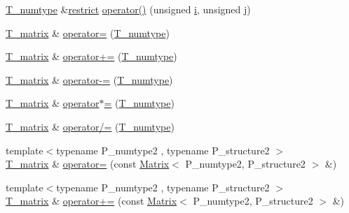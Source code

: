 \begin{DoxyCompactItemize}
\item 
\hyperlink{classMatrix_aa2e0c7f09cbf31c078ad0b0977588e70}{T\+\_\+numtype} \&\hyperlink{compiler_8h_a080abdcb9c02438f1cd2bb707af25af8}{restrict} \hyperlink{classMatrix_aed58f052dd1ef9c14a3fcc3335a90905}{operator()} (unsigned \hyperlink{indexexpr_8h_aabd77643995707c185e95c8cb2782c81}{i}, unsigned \hyperlink{indexexpr_8h_aa1f3325d66516548e69238097857fa98}{j})
\item 
\hyperlink{classMatrix_ae07f7dfb83325c5854333ed7e85d2ebb}{T\+\_\+matrix} \& \hyperlink{classMatrix_a7685367f9f39a4a5491f1ebdd8bc9c1f}{operator=} (\hyperlink{classMatrix_aa2e0c7f09cbf31c078ad0b0977588e70}{T\+\_\+numtype})
\item 
\hyperlink{classMatrix_ae07f7dfb83325c5854333ed7e85d2ebb}{T\+\_\+matrix} \& \hyperlink{classMatrix_a7c018a47b2dc374ce5557011ce25a97c}{operator+=} (\hyperlink{classMatrix_aa2e0c7f09cbf31c078ad0b0977588e70}{T\+\_\+numtype})
\item 
\hyperlink{classMatrix_ae07f7dfb83325c5854333ed7e85d2ebb}{T\+\_\+matrix} \& \hyperlink{classMatrix_a4c6e1284becba17f5e718be131297b05}{operator-\/=} (\hyperlink{classMatrix_aa2e0c7f09cbf31c078ad0b0977588e70}{T\+\_\+numtype})
\item 
\hyperlink{classMatrix_ae07f7dfb83325c5854333ed7e85d2ebb}{T\+\_\+matrix} \& \hyperlink{classMatrix_a5efa9625f2bc76625fb8dbd4d7c0ee79}{operator$\ast$=} (\hyperlink{classMatrix_aa2e0c7f09cbf31c078ad0b0977588e70}{T\+\_\+numtype})
\item 
\hyperlink{classMatrix_ae07f7dfb83325c5854333ed7e85d2ebb}{T\+\_\+matrix} \& \hyperlink{classMatrix_ac40dded18c2020ca4e07fa62357c1cf6}{operator/=} (\hyperlink{classMatrix_aa2e0c7f09cbf31c078ad0b0977588e70}{T\+\_\+numtype})
\item 
{\footnotesize template$<$typename P\+\_\+numtype2 , typename P\+\_\+structure2 $>$ }\\\hyperlink{classMatrix_ae07f7dfb83325c5854333ed7e85d2ebb}{T\+\_\+matrix} \& \hyperlink{classMatrix_aa8f50674c5b4ebbbabdd118b74a449c1}{operator=} (const \hyperlink{classMatrix}{Matrix}$<$ P\+\_\+numtype2, P\+\_\+structure2 $>$ \&)
\item 
{\footnotesize template$<$typename P\+\_\+numtype2 , typename P\+\_\+structure2 $>$ }\\\hyperlink{classMatrix_ae07f7dfb83325c5854333ed7e85d2ebb}{T\+\_\+matrix} \& \hyperlink{classMatrix_a0ccdf8f6905ab67a877e294e5df885cd}{operator+=} (const \hyperlink{classMatrix}{Matrix}$<$ P\+\_\+numtype2, P\+\_\+structure2 $>$ \&)
\item 

\end{DoxyCompactItemize}
